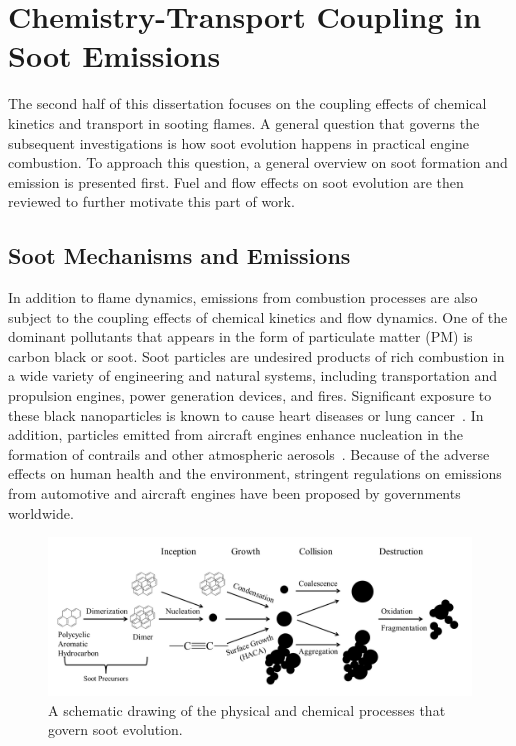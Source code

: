 \section{Chemistry-Transport Coupling in Soot Emissions}

The second half of this dissertation focuses on the coupling effects of chemical kinetics and transport in sooting flames.  A general question that governs the subsequent investigations is how soot evolution happens in practical engine combustion.  To approach this question, a general overview on soot formation and emission is presented first.  Fuel and flow effects on soot evolution are then reviewed to further motivate this part of work.

\subsection{Soot Mechanisms and Emissions}\label{sec:intro-soot-generic}

In addition to flame dynamics, emissions from combustion processes are also subject to the coupling effects of chemical kinetics and flow dynamics.  One of the dominant pollutants that appears in the form of particulate matter (PM) is carbon black or soot.  Soot particles are undesired products of rich combustion in a wide variety of engineering and natural systems, including transportation and propulsion engines, power generation devices, and fires.  Significant exposure to these black nanoparticles is known to cause heart diseases or lung cancer~\cite{donaldson05}.  In addition, particles emitted from aircraft engines enhance nucleation in the formation of contrails and other atmospheric aerosols~\cite{jensen97,seinfeldbook98}.  Because of the adverse effects on human health and the environment, stringent regulations on emissions from automotive and aircraft engines have been proposed by governments worldwide.

\begin{figure}[t]
  \centering
  \scriptsize
  \includegraphics[width=1.0\textwidth]{ch-intro/soot.png}
  \normalsize
  \caption{A schematic drawing of the physical and chemical processes that govern soot evolution.}
  \label{fig:soot}
\end{figure}

